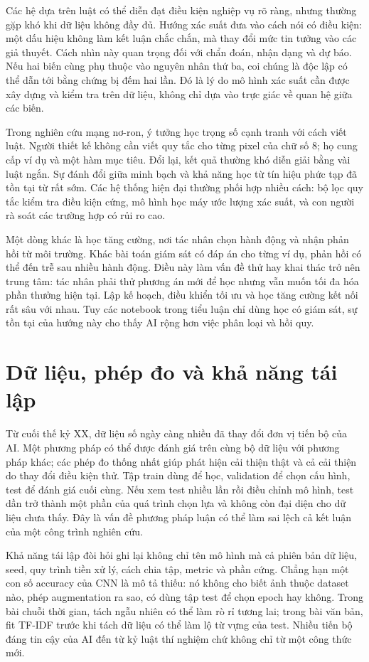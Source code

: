\documentclass[12pt,a4paper]{report}
\begin{document}
Các hệ dựa trên luật có thể diễn đạt điều kiện nghiệp vụ rõ ràng, nhưng thường gặp khó khi dữ liệu không đầy đủ. Hướng xác suất đưa vào cách nói có điều kiện: một dấu hiệu không làm kết luận chắc chắn, mà thay đổi mức tin tưởng vào các giả thuyết. Cách nhìn này quan trọng đối với chẩn đoán, nhận dạng và dự báo. Nếu hai biến cùng phụ thuộc vào nguyên nhân thứ ba, coi chúng là độc lập có thể dẫn tới bằng chứng bị đếm hai lần. Đó là lý do mô hình xác suất cần được xây dựng và kiểm tra trên dữ liệu, không chỉ dựa vào trực giác về quan hệ giữa các biến.

Trong nghiên cứu mạng nơ-ron, ý tưởng học trọng số cạnh tranh với cách viết luật. Người thiết kế không cần viết quy tắc cho từng pixel của chữ số 8; họ cung cấp ví dụ và một hàm mục tiêu. Đổi lại, kết quả thường khó diễn giải bằng vài luật ngắn. Sự đánh đổi giữa minh bạch và khả năng học từ tín hiệu phức tạp đã tồn tại từ rất sớm. Các hệ thống hiện đại thường phối hợp nhiều cách: bộ lọc quy tắc kiểm tra điều kiện cứng, mô hình học máy ước lượng xác suất, và con người rà soát các trường hợp có rủi ro cao.

Một dòng khác là học tăng cường, nơi tác nhân chọn hành động và nhận phản hồi từ môi trường. Khác bài toán giám sát có đáp án cho từng ví dụ, phản hồi có thể đến trễ sau nhiều hành động. Điều này làm vấn đề thử hay khai thác trở nên trung tâm: tác nhân phải thử phương án mới để học nhưng vẫn muốn tối đa hóa phần thưởng hiện tại. Lập kế hoạch, điều khiển tối ưu và học tăng cường kết nối rất sâu với nhau. Tuy các notebook trong tiểu luận chỉ dùng học có giám sát, sự tồn tại của hướng này cho thấy AI rộng hơn việc phân loại và hồi quy.

\section{Dữ liệu, phép đo và khả năng tái lập}
Từ cuối thế kỷ XX, dữ liệu số ngày càng nhiều đã thay đổi đơn vị tiến bộ của AI. Một phương pháp có thể được đánh giá trên cùng bộ dữ liệu với phương pháp khác; các phép đo thống nhất giúp phát hiện cải thiện thật và cả cải thiện do thay đổi điều kiện thử. Tập train dùng để học, validation để chọn cấu hình, test để đánh giá cuối cùng. Nếu xem test nhiều lần rồi điều chỉnh mô hình, test dần trở thành một phần của quá trình chọn lựa và không còn đại diện cho dữ liệu chưa thấy. Đây là vấn đề phương pháp luận có thể làm sai lệch cả kết luận của một công trình nghiên cứu.

Khả năng tái lập đòi hỏi ghi lại không chỉ tên mô hình mà cả phiên bản dữ liệu, seed, quy trình tiền xử lý, cách chia tập, metric và phần cứng. Chẳng hạn một con số accuracy của CNN là mô tả thiếu: nó không cho biết ảnh thuộc dataset nào, phép augmentation ra sao, có dùng tập test để chọn epoch hay không. Trong bài chuỗi thời gian, tách ngẫu nhiên có thể làm rò rỉ tương lai; trong bài văn bản, fit TF-IDF trước khi tách dữ liệu có thể làm lộ từ vựng của test. Nhiều tiến bộ đáng tin cậy của AI đến từ kỷ luật thí nghiệm chứ không chỉ từ một công thức mới.
\end{document}
